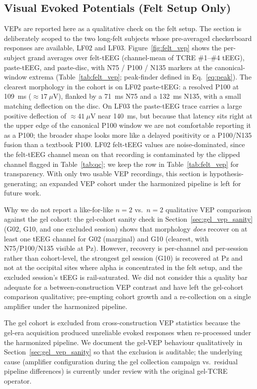 \documentclass[10pt,a4paper]{article}
\providecommand{\upmu}{\ensuremath{\mu}}        %
\begin{document}
\subsection{Visual Evoked Potentials (Felt Setup Only)}\label{sec:vep_scope}
VEPs are reported here as a qualitative check on the felt setup. The section is deliberately scoped to the two long-felt subjects whose pre-averaged checkerboard responses are available, LF02 and LF03. Figure~\ref{fig:felt_vep} shows the per-subject grand averages over felt-tEEG (channel-mean of TCRE \#1--\#4 tEEG), paste-tEEG, and paste-disc, with N75 / P100 / N135 markers at the canonical-window extrema (Table~\ref{tab:felt_vep}; peak-finder defined in Eq.~\eqref{eq:peak}). The clearest morphology in the cohort is on LF02 paste-tEEG: a resolved P100 at 109~ms ($\approx 17\ \upmu$V), flanked by a 71~ms N75 and a 132~ms N135, with a small matching deflection on the disc. On LF03 the paste-tEEG trace carries a large positive deflection of $\approx 41\ \upmu$V near 140~ms, but because that latency sits right at the upper edge of the canonical P100 window we are not comfortable reporting it as a P100; the broader shape looks more like a delayed positivity or a P100/N135 fusion than a textbook P100. LF02 felt-tEEG values are noise-dominated, since the felt-tEEG channel mean on that recording is contaminated by the clipped channel flagged in Table~\ref{tab:qc}; we keep the row in Table~\ref{tab:felt_vep} for transparency. With only two usable VEP recordings, this section is hypothesis-generating; an expanded VEP cohort under the harmonized pipeline is left for future work.

Why we do not report a like-for-like $n=2$ vs.\ $n=2$ qualitative VEP comparison against the gel cohort: the gel-cohort sanity check in Section~\ref{sec:gel_vep_sanity} (G02, G10, and one excluded session) shows that morphology \emph{does} recover on at least one tEEG channel for G02 (marginal) and G10 (clearest, with N75/P100/N135 visible at Pz). However, recovery is per-channel and per-session rather than cohort-level, the strongest gel session (G10) is recovered at Pz and not at the occipital sites where alpha is concentrated in the felt setup, and the excluded session's tEEG is rail-saturated. We did not consider this a quality bar adequate for a between-construction VEP contrast and have left the gel-cohort comparison qualitative; pre-empting cohort growth and a re-collection on a single amplifier under the harmonized pipeline.

The gel cohort is excluded from cross-construction VEP statistics because the gel-era acquisition produced unreliable evoked responses when re-processed under the harmonized pipeline. We document the gel-VEP behaviour qualitatively in Section~\ref{sec:gel_vep_sanity} so that the exclusion is auditable; the underlying cause (amplifier configuration during the gel collection campaign vs.\ residual pipeline differences) is currently under review with the original gel-TCRE operator.
\end{document}
